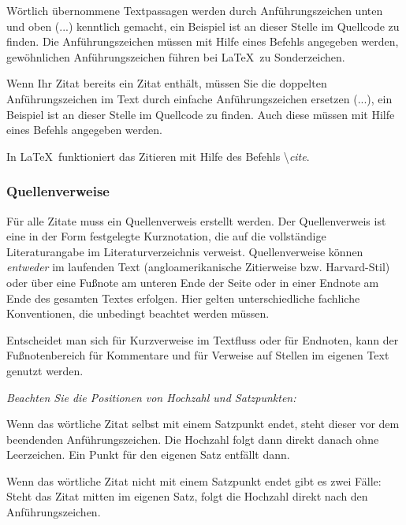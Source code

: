 \documentclass[a4paper,11pt]{article}%
\renewcommand{\\}{\vspace*{0.5\baselineskip} \newline}
\begin{document}
Wörtlich übernommene Textpassagen werden durch Anführungszeichen unten und oben (\glqq...\grqq) kenntlich gemacht, ein Beispiel ist an dieser Stelle im Quellcode zu finden. Die Anführungszeichen müssen mit Hilfe eines Befehls angegeben werden, gewöhnlichen Anführungszeichen führen bei \LaTeX~zu Sonderzeichen.\\

Wenn Ihr Zitat bereits ein Zitat enthält, müssen Sie die doppelten Anführungszeichen im Text durch einfache Anführungszeichen ersetzen (\glq...\grq), ein Beispiel ist an dieser Stelle im Quellcode zu finden. Auch diese müssen mit Hilfe eines Befehls angegeben werden.\\

In \LaTeX~funktioniert das Zitieren\cite[Beispielzitat aus Quelle 7]{FN} mit Hilfe des Befehls \textbackslash\textit{cite}.



\subsubsection{Quellenverweise}

Für alle Zitate muss ein Quellenverweis erstellt werden. Der Quellenverweis ist eine in der Form festgelegte Kurznotation, die auf die vollständige Literaturangabe im Literaturverzeichnis verweist. Quellenverweise können \textit{entweder} im laufenden Text (angloamerikanische Zitierweise bzw. Harvard-Stil) oder über eine Fußnote am unteren Ende der Seite oder in einer Endnote am Ende des gesamten Textes erfolgen. Hier gelten unterschiedliche fachliche Konventionen, die unbedingt beachtet werden müssen.\\

Entscheidet man sich für Kurzverweise im Textfluss oder für Endnoten, kann der Fußnotenbereich für Kommentare und für Verweise auf Stellen im eigenen Text genutzt werden.\\

\textit{Beachten Sie die Positionen von Hochzahl und Satzpunkten:}\\ 

Wenn das wörtliche Zitat selbst mit einem Satzpunkt endet, steht dieser vor dem beendenden Anführungszeichen. Die Hochzahl folgt dann direkt danach ohne Leerzeichen. Ein Punkt für den eigenen Satz entfällt dann.\\

Wenn das wörtliche Zitat nicht mit einem Satzpunkt endet gibt es zwei Fälle: Steht das Zitat mitten im eigenen Satz, folgt die Hochzahl direkt nach den Anführungszeichen.\\
\end{document}
